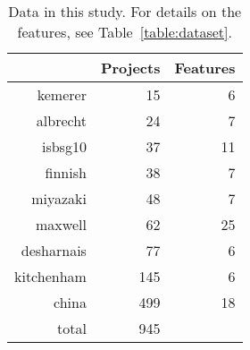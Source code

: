 \begin{wraptable}{r}{1.7in}
\vspace{-5pt}
\scriptsize
\caption{Data   in this study. For details on the features, see Table~\ref{table:dataset}.}\label{table:dataset_c}

~\\
\centering
\begin{tabular}{r|rr}
 	&Projects&	Features\\\hline
kemerer	&15&	6\\
albrecht&	24&	7\\
isbsg10&    37& 11\\
finnish	&38&	7\\
miyazaki&	48&	7\\
maxwell&	62	&25\\
desharnais&	77&	6\\
kitchenham& 145&    6\\
china&  499&    18\\\hline
total & 945
\end{tabular}
\vspace{-15pt}
\end{wraptable}